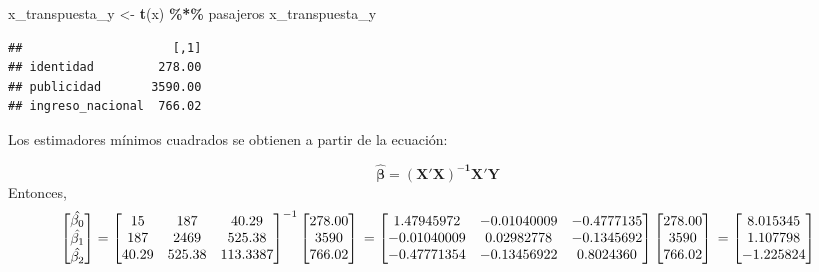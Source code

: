 \documentclass[
]{book}
\newenvironment{Shaded}{\begin{snugshade}}{\end{snugshade}}
\newcommand{\FunctionTok}[1]{\textcolor[rgb]{0.13,0.29,0.53}{\textbf{#1}}}
\newcommand{\NormalTok}[1]{#1}
\newcommand{\OtherTok}[1]{\textcolor[rgb]{0.56,0.35,0.01}{#1}}
\newcommand{\SpecialCharTok}[1]{\textcolor[rgb]{0.81,0.36,0.00}{\textbf{#1}}}
\begin{document}
\begin{Shaded}
\begin{Highlighting}[]
\NormalTok{x\_transpuesta\_y }\OtherTok{\textless{}{-}} \FunctionTok{t}\NormalTok{(x) }\SpecialCharTok{\%*\%}\NormalTok{ pasajeros}
\NormalTok{x\_transpuesta\_y}
\end{Highlighting}
\end{Shaded}

\begin{verbatim}
##                     [,1]
## identidad         278.00
## publicidad       3590.00
## ingreso_nacional  766.02
\end{verbatim}

Los estimadores mínimos cuadrados se obtienen a partir de la ecuación:

\[
\begin{equation}
\boldsymbol{\hat{\beta}=(X'X)^{-1}X'Y}
\label{eq:estimacion-coeficientes-ecuaciones-normales}
\end{equation}
\]
Entonces,
\[
\begin{equation}
\begin{bmatrix}
\hat{\beta_{0}}\\ 
\hat{\beta_{1}}\\ 
\hat{\beta_{2}}
\end{bmatrix} = \begin{bmatrix}
 15&   187 & 40.29\\ 
 187&   2469& 525.38\\ 
 40.29  &  525.38 & 113.3387
\end{bmatrix}^{-1}
\end{equation} \begin{bmatrix}
278.00\\ 
3590\\ 
766.02
\end{bmatrix} \\
= \begin{bmatrix}
 1.47945972&   -0.01040009 & -0.4777135\\ 
 -0.01040009&   0.02982778& -0.1345692\\ 
 -0.47771354  &  -0.13456922  & 0.8024360
\end{bmatrix} \begin{bmatrix}
278.00\\ 
3590\\ 
766.02
\end{bmatrix} \\
= \begin{bmatrix}
8.015345\\ 
1.107798\\ 
-1.225824
\end{bmatrix}
\]
\end{document}
